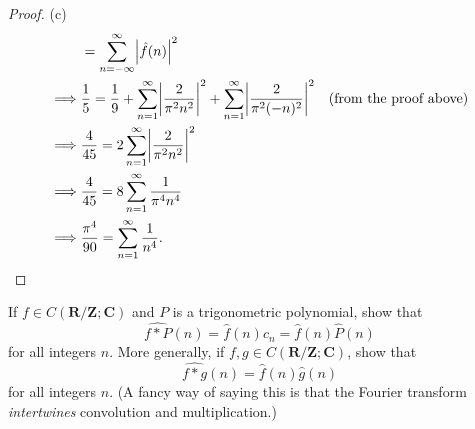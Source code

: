 \begin{proof}{(c)}
\begin{align*}
                 & = \sum_{n = -\infty}^\infty \abs*{\hat{f}(n)}^2                                                                                                                      \\
        \implies & \frac{1}{5} = \frac{1}{9} + \sum_{n = 1}^\infty \abs*{\frac{2}{\pi^2 n^2}}^2 + \sum_{n = 1}^\infty \abs*{\frac{2}{\pi^2 (-n)^2}}^2 & \text{(from the proof above)}   \\
        \implies & \frac{4}{45} = 2 \sum_{n = 1}^\infty \abs*{\frac{2}{\pi^2 n^2}}^2                                                                                                    \\
        \implies & \frac{4}{45} = 8 \sum_{n = 1}^\infty \frac{1}{\pi^4 n^4}                                                                                                             \\
        \implies & \frac{\pi^4}{90} = \sum_{n = 1}^\infty \frac{1}{n^4}.
    \end{align*}
\end{proof}

\begin{exercise}\label{ex 5.5.3}
    If \(f \in C(\mathbf{R} / \mathbf{Z} ; \mathbf{C})\) and \(P\) is a trigonometric polynomial, show that
    \[
        \widehat{f * P}(n) = \hat{f}(n) c_n = \hat{f}(n) \hat{P}(n)
    \]
    for all integers \(n\).
    More generally, if \(f, g \in C(\mathbf{R} / \mathbf{Z} ; \mathbf{C})\), show that
    \[
        \widehat{f * g}(n) = \hat{f}(n) \hat{g}(n)
    \]
    for all integers \(n\).
    (A fancy way of saying this is that the Fourier transform \emph{intertwines} convolution and multiplication.)
\end{exercise}

